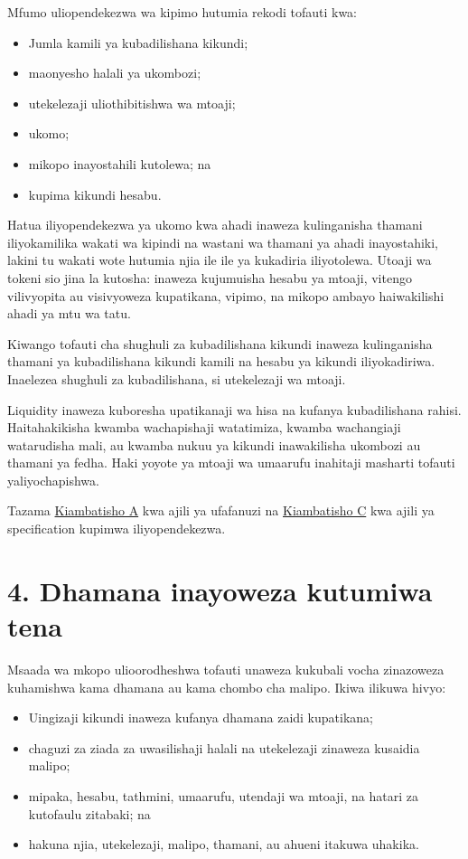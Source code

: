 \documentclass[11pt]{article}
\begin{document}
Mfumo uliopendekezwa wa kipimo hutumia rekodi tofauti kwa:

\begin{itemize}[leftmargin=*]
\item Jumla kamili ya kubadilishana kikundi;
\item maonyesho halali ya ukombozi;
\item utekelezaji uliothibitishwa wa mtoaji;
\item ukomo;
\item mikopo inayostahili kutolewa; na
\item kupima kikundi hesabu.
\end{itemize}
Hatua iliyopendekezwa ya ukomo kwa ahadi inaweza kulinganisha thamani iliyokamilika wakati wa kipindi na wastani wa thamani ya ahadi inayostahiki, lakini tu wakati wote hutumia njia ile ile ya kukadiria iliyotolewa. Utoaji wa tokeni sio jina la kutosha: inaweza kujumuisha hesabu ya mtoaji, vitengo vilivyopita au visivyoweza kupatikana, vipimo, na mikopo ambayo haiwakilishi ahadi ya mtu wa tatu.

Kiwango tofauti cha shughuli za kubadilishana kikundi inaweza kulinganisha thamani ya kubadilishana kikundi kamili na hesabu ya kikundi iliyokadiriwa. Inaelezea shughuli za kubadilishana, si utekelezaji wa mtoaji.

Liquidity inaweza kuboresha upatikanaji wa hisa na kufanya kubadilishana rahisi. Haitahakikisha kwamba wachapishaji watatimiza, kwamba wachangiaji watarudisha mali, au kwamba nukuu ya kikundi inawakilisha ukombozi au thamani ya fedha. Haki yoyote ya mtoaji wa umaarufu inahitaji masharti tofauti yaliyochapishwa.

Tazama \href{https://docs.cosmolocal.credit/sw/white-paper/appendix-a-math-box}{Kiambatisho A} kwa ajili ya ufafanuzi na \href{https://docs.cosmolocal.credit/sw/white-paper/appendix-c-kpi-definitions}{Kiambatisho C} kwa ajili ya specification kupimwa iliyopendekezwa.


\section*{4. Dhamana inayoweza kutumiwa tena}

Msaada wa mkopo ulioorodheshwa tofauti unaweza kukubali vocha zinazoweza kuhamishwa kama dhamana au kama chombo cha malipo. Ikiwa ilikuwa hivyo:

\begin{itemize}[leftmargin=*]
\item Uingizaji kikundi inaweza kufanya dhamana zaidi kupatikana;
\item chaguzi za ziada za uwasilishaji halali na utekelezaji zinaweza kusaidia malipo;
\item mipaka, hesabu, tathmini, umaarufu, utendaji wa mtoaji, na hatari za kutofaulu zitabaki; na
\item hakuna njia, utekelezaji, malipo, thamani, au ahueni itakuwa uhakika.
\end{itemize}
\end{document}
